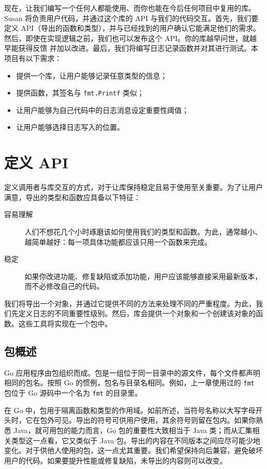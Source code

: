 现在，让我们编写一个任何人都能使用、而你也能在今后任何项目中复用的库。Susan 将负责用户代码，并通过这个库的 API 与我们的代码交互。首先，我们要定义 API（导出的函数和类型），并与已经找到的用户确认它能满足他们的需求。然后，即使在实现逻辑之前，我们也可以发布这个 API。你的库越早问世，就越早能获得反馈
并加以改进。最后，我们将编写日志记录函数并对其进行测试。本项目有以下需求：

\begin{itemize}
  \item 提供一个库，让用户能够记录任意类型的信息；
  \item 提供函数，其签名与 \texttt{fmt.Printf} 类似；
  \item 让用户能够为自己代码中的日志消息设定重要性阈值；
  \item 让用户能够选择日志写入的位置。
\end{itemize}

\section{定义 API}

定义调用者与库交互的方式，对于让库保持稳定且易于使用至关重要。为了让用户满意，导出的类型和函数应具备以下特征：

\begin{description}
  \item[容易理解] 人们不想花几个小时琢磨该如何使用我们的类型和函数。为此，通常越小、越简单越好：每一项具体功能都应该只用一个函数来完成。
  \item[稳定] 如果你改进功能、修复缺陷或添加功能，用户应该能够直接采用最新版本，而不必修改自己的代码。
\end{description}

我们将导出一个对象，并通过它提供不同的方法来处理不同的严重程度。为此，我们先定义日志的不同重要性级别。然后，库会提供一个对象和一个创建该对象的函数。这些工具将实现在一个包中。

\subsection{包概述}

Go 应用程序由包组织而成。包是一组位于同一目录中的源文件，每个文件都声明相同的包名。按照 Go 的惯例，包名与目录名相同。例如，上一章使用过的 \texttt{fmt} 包位于 Go 源码中一个名为 \texttt{fmt} 的目录里。

在 Go 中，包用于隔离函数和类型的作用域。如前所述，当符号名称以大写字母开头时，它在包外可见。导出的符号可供用户使用，其余符号则留在包内。如果你熟悉 Java，就可用包的能力而言，Go 包的重要性大致相当于 Java 类；而从汇集相关类型这一点看，它又类似于 Java 包。导出的内容在不同版本之间应尽可能少地变化。对于供他人使用的包，这一点尤其重要。我们希望保持向后兼容，避免破坏用户的代码。如果要提升性能或修复缺陷，未导出的内容则可以改变。

